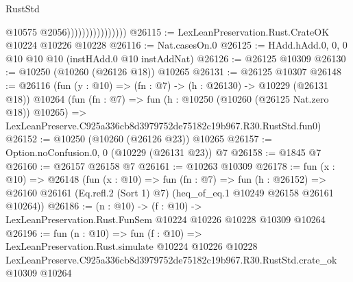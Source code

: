 \begin{lexlean}{RustStd}
\begin{coremodule}
                                    @10575
                                    @2056))))))))))))))))
@26115 := LexLeanPreservation.Rust.CrateOK @10224 @10226 @10228
@26116 := Nat.casesOn.{0}
@26125 := HAdd.hAdd.{0, 0, 0} @10 @10 @10 (instHAdd.{0} @10 instAddNat)
@26126 := @26125 @10309
@26130 := @10250 (@10260 (@26126 @18)) @10265
@26131 := @26125 @10307
@26148 := @26116
    (fun (y : @10) => (fn : @7) -> (h : @26130) -> @10229 (@26131 @18))
    @10264
    (fun (fn : @7) =>
    fun (h : @10250 (@10260 (@26125 Nat.zero @18)) @10265) =>
    LexLeanPreserve.C925a336cb8d3979752de75182c19b967.R30.RustStd.fun0)
@26152 := @10250 (@10260 (@26126 @23)) @10265
@26157 := Option.noConfusion.{0, 0} (@10229 (@26131 @23)) @7
@26158 := @1845 @7
@26160 := @26157 @26158 @7
@26161 := @10263 @10309
@26178 := fun (x : @10) =>
  @26148
    (fun (x : @10) =>
    fun (fn : @7) =>
    fun (h : @26152) =>
    @26160 @26161 (Eq.refl.{2} (Sort 1) @7) (heq_of_eq.{1} @10249 @26158 @26161 @10264))
@26186 := (n : @10) ->
  (f : @10) -> LexLeanPreservation.Rust.FunSem @10224 @10226 @10228 @10309 @10264
@26196 := fun (n : @10) =>
  fun (f : @10) =>
  LexLeanPreservation.Rust.simulate
    @10224
    @10226
    @10228
    LexLeanPreserve.C925a336cb8d3979752de75182c19b967.R30.RustStd.crate_ok
    @10309
    @10264
\end{coremodule}
\end{lexlean}
